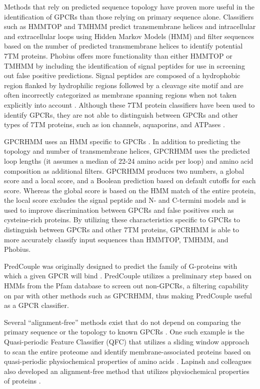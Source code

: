 Methods that rely on predicted sequence topology have proven more useful in the identification of GPCRs than those relying on primary sequence alone. Classifiers such as HMMTOP \cite{Tusnady2001} and TMHMM \cite{Krogh2001} predict transmembrane helices and intracellular and extracellular loops using Hidden Markov Models (HMM) and filter sequences based on the number of predicted transmembrane helices to identify potential 7TM proteins. Phobius \cite{Kall2004,Kall2007} offers more functionality than either HMMTOP or TMHMM by including the identification of signal peptides for use in screening out false positive predictions.  Signal peptides are composed of a hydrophobic region flanked by hydrophilic regions followed by a cleavage site motif and are often incorrectly categorized as membrane spanning regions when not taken explicitly into account \cite{Krogh2001, Kall2004, Kall2007, Wistrand2006}.  Although these 7TM protein classifiers have been used to identify GPCRs, they are not able to distinguish between GPCRs and other types of 7TM proteins, such as ion channels, aquaporins, and ATPases \cite{Inoue2005}.

GPCRHMM uses an HMM specific to GPCRs \cite{Wistrand2006}. In addition to predicting the topology and number of transmembrane helices, GPCRHMM uses the predicted loop lengths (it assumes a median of 22-24 amino acids per loop) and amino acid composition as additional filters.  GPCRHMM produces two numbers, a global score and a local score, and a Boolean prediction based on default cutoffs for each score. Whereas the global score is based on the HMM match of the entire protein, the local score excludes the signal peptide and N- and C-termini models and is used to improve discrimination between GPCRs and false positives such as cysteine-rich proteins.  By utilizing these characteristics specific to GPCRs to distinguish between GPCRs and other 7TM proteins, GPCRHMM is able to more accurately classify input sequences than HMMTOP, TMHMM, and Phobius.

PredCouple was originally designed to predict the family of G-proteins with which a given GPCR will bind \cite{Sgourakis2005,Sgourakis2005a}. PredCouple utilizes a preliminary step based on HMMs from the Pfam database \cite{Finn2010, Punta2012} to screen out non-GPCRs, a filtering capability on par with other methods such as GPCRHMM, thus making PredCouple useful as a GPCR classifier.

Several ``alignment-free'' methods exist that do not depend on comparing the primary sequence or the topology to known GPCRs \cite{Strope2007}. One such example is the Quasi-periodic Feature Classifier (QFC) that utilizes a sliding window approach to scan the entire proteome and identify membrane-associated proteins based on quasi-periodic physiochemical properties of amino acids \cite{Kim2000}. Lapinsh and colleagues also developed an alignment-free method that utilizes physiochemical properties of proteins \cite{Lapinsh2002}.

